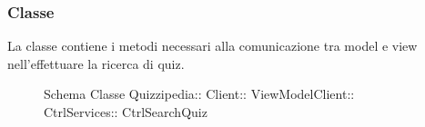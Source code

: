 \subsubsection{Classe }
La classe contiene i metodi necessari alla comunicazione tra model e view nell'effettuare la ricerca di quiz.
\begin{figure}[H]
\centering
\noindent{}
\caption[Schema Classe CtrlSearchQuiz]{Schema Classe Quizzipedia:: Client:: ViewModelClient:: CtrlServices:: CtrlSearchQuiz}
\end{figure}
